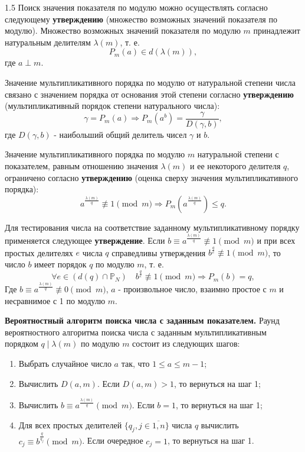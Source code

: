 \documentclass[14pt,a4paper]{extarticle}
\begin{document}
\begin{spacing}{1.5}
Поиск значения показателя по модулю можно осуществлять согласно следующему \textbf{утверждению} (множество возможных значений показателя по модулю). Множество возможных значений показателя по модулю \(m\) принадлежит натуральным делителям \(\lambda(m)\), т. е.
\begin{equation}\tag{1.4}
    P_m(a) \in d(\lambda(m)),
\end{equation}
где \(a \perp m\).

Значение мультипликативного порядка по модулю от натуральной степени числа связано с значением порядка от основания этой степени согласно \textbf{утверждению} (мультипликативный порядок степени натурального числа):
\begin{equation}\tag{1.5}
    \gamma = P_m(a) \Rightarrow P_m(a^b) = \frac{\gamma}{D(\gamma, b)},
\end{equation}
где \(D(\gamma, b)\) - наибольший общий делитель чисел \(\gamma\) и \(b\).

Значение мультипликативного порядка по модулю \(m\) натуральной степени с показателем, равным отношению значения \(\lambda(m)\) и ее некоторого делителя \(q\), ограничено согласно \textbf{утверждению} (оценка сверху значения мультипликативного порядка):
\begin{equation}\tag{1.6}
    a^{\frac{\lambda(m)}{q}} \not\equiv 1 \pmod m \Rightarrow P_m(a^{\frac{\lambda(m)}{q}}) \leq q.
\end{equation}

Для тестирования числа на соответствие заданному мультипликативному порядку применяется следующее \textbf{утверждение}. Если \(b \equiv a^{\frac{\lambda(m)}{q}} \not\equiv 1 \pmod m\) и при всех простых делителях \(e\) числа \(q\) справедливы утверждения \(b^{\frac{q}{e}} \not\equiv 1 \pmod m\), то число \(b\) имеет порядок \(q\) по модулю \(m\), т. е.
\begin{equation}\tag{1.7}
    \forall e \in (d(q) \cap \mathbb{P}_N) \quad b^{\frac{q}{e}} \not\equiv 1 \pmod m \Rightarrow P_m(b) = q,
\end{equation}
Где \(b \equiv a^{\frac{\lambda(m)}{q}} \not\equiv 0 \pmod m\), \(a\) - произвольное число, взаимно простое с \(m\) и несравнимое с 1 по модулю \(m\).

\textbf{Вероятностный алгоритм поиска числа с заданным показателем.} Раунд вероятностного алгоритма поиска числа с заданным мультипликативным порядком \(q \mid \lambda(m)\) по модулю \(m\) состоит из следующих шагов:
\begin{enumerate}
    \item Выбрать случайное число \(a\) так, что \(1 \le a \le m-1\);
    \item Вычислить \(D(a, m)\). Если \(D(a, m) > 1\), то вернуться на шаг 1;
    \item Вычислить \(b \equiv a^{\frac{\lambda(m)}{q}} \pmod m\). Если \(b = 1\), то вернуться на шаг 1;
    \item Для всех простых делителей \(\{q_j, j \in \overline{1, n}\}\) числа \(q\) вычислить \(c_j \equiv b^{\frac{q}{q_j}} \pmod m\). Если очередное \(c_j = 1\), то вернуться на шаг 1.
\end{enumerate}


\end{spacing}
\end{document}
